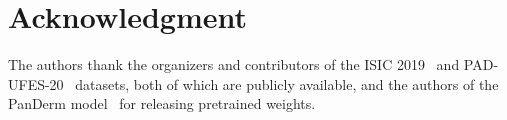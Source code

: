 %
%
%
%
%
%
%
%

\section*{Acknowledgment}

The authors thank the organizers and contributors of the ISIC
2019~\cite{tschandl2018ham10000,hernandezperez2024bcn20000,codella2018isbi}
and PAD-UFES-20~\cite{pacheco2020padufes} datasets, both of which are
publicly available, and the authors of the PanDerm model~\cite{yan2025panderm}
for releasing pretrained weights.

